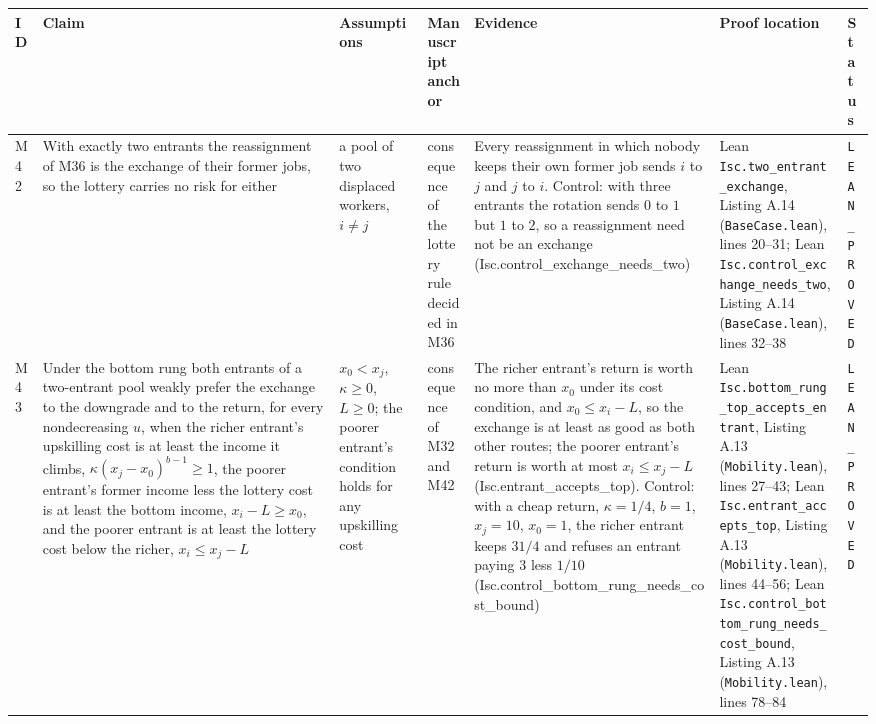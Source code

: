 \documentclass[10pt]{article}
\begin{document}
{\small
\begin{longtable}{>{\raggedright\arraybackslash}p{0.8cm} >{\raggedright\arraybackslash}p{5.0cm} >{\raggedright\arraybackslash}p{2.9cm} >{\raggedright\arraybackslash}p{3.9cm} >{\raggedright\arraybackslash}p{4.4cm} >{\raggedright\arraybackslash}p{3.6cm} >{\raggedright\arraybackslash}p{2.5cm}}
\toprule ID & Claim & Assumptions & Manuscript anchor & Evidence & Proof location & Status \\ \midrule \endhead
M42 & With exactly two entrants the reassignment of M36 is the exchange of their former jobs, so the lottery carries no risk for either & a pool of two displaced workers, $i\ne j$ & consequence of the lottery rule decided in M36 & Every reassignment in which nobody keeps their own former job sends $i$ to $j$ and $j$ to $i$. Control: with three entrants the rotation sends $0$ to $1$ but $1$ to $2$, so a reassignment need not be an exchange (Isc.control\_exchange\_needs\_two) & Lean \nolinkurl{Isc.two_entrant_exchange}, Listing A.14 (\nolinkurl{BaseCase.lean}), lines 20--31; Lean \nolinkurl{Isc.control_exchange_needs_two}, Listing A.14 (\nolinkurl{BaseCase.lean}), lines 32--38 & \texttt{LEAN\_PROVED} \\ \midrule
M43 & Under the bottom rung both entrants of a two-entrant pool weakly prefer the exchange to the downgrade and to the return, for every nondecreasing $u$, when the richer entrant's upskilling cost is at least the income it climbs, $\kappa(x_j-x_0)^{b-1}\ge1$, the poorer entrant's former income less the lottery cost is at least the bottom income, $x_i-L\ge x_0$, and the poorer entrant is at least the lottery cost below the richer, $x_i\le x_j-L$ & $x_0<x_j$, $\kappa\ge0$, $L\ge0$; the poorer entrant's condition holds for any upskilling cost & consequence of M32 and M42 & The richer entrant's return is worth no more than $x_0$ under its cost condition, and $x_0\le x_i-L$, so the exchange is at least as good as both other routes; the poorer entrant's return is worth at most $x_i\le x_j-L$ (Isc.entrant\_accepts\_top). Control: with a cheap return, $\kappa=1/4$, $b=1$, $x_j=10$, $x_0=1$, the richer entrant keeps $31/4$ and refuses an entrant paying $3$ less $1/10$ (Isc.control\_bottom\_rung\_needs\_cost\_bound) & Lean \nolinkurl{Isc.bottom_rung_top_accepts_entrant}, Listing A.13 (\nolinkurl{Mobility.lean}), lines 27--43; Lean \nolinkurl{Isc.entrant_accepts_top}, Listing A.13 (\nolinkurl{Mobility.lean}), lines 44--56; Lean \nolinkurl{Isc.control_bottom_rung_needs_cost_bound}, Listing A.13 (\nolinkurl{Mobility.lean}), lines 78--84 & \texttt{LEAN\_PROVED} \\ \midrule

\end{longtable}}
\end{document}
